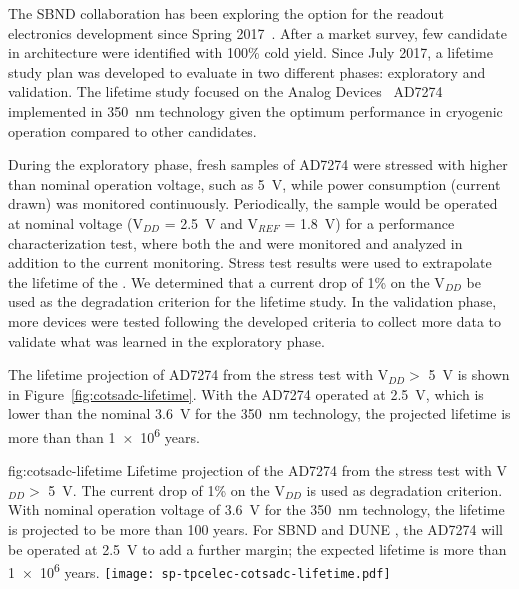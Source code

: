 \label{sec:fdsp-tpcelec-design-femb-alt-cots}

The SBND collaboration has been exploring the   option 
for the  readout electronics development since Spring 
2017~\cite{Chen:2018zic}. After a market survey, few candidate  
in  architecture were identified with 100\% cold yield. Since 
July 2017, a lifetime study plan was developed to evaluate  
 in two different phases: exploratory and validation. The 
lifetime study focused on the Analog Devices~\cite{AnalogDevices} AD7274 
implemented in  \SI{350}{nm}  technology given 
the optimum performance in cryogenic operation compared to other candidates.

During the exploratory phase, fresh samples of   
AD7274 were stressed with higher than nominal operation voltage, such as
\SI{5}{V}, while power consumption (current drawn) was monitored continuously. 
Periodically, the sample would be operated at nominal voltage (V$_{DD}$ = \SI{2.5}{V} 
and V$_{REF}$ = \SI{1.8}{V}) for a performance characterization test, where 
both the  and  were monitored and analyzed in addition 
to the current monitoring. Stress test results were used to extrapolate the 
lifetime of the  . We determined that a current drop 
of \num{1}\% on the V$_{DD}$ be used as the degradation criterion for the lifetime 
study. In the validation phase, more devices were tested following the developed 
criteria to collect more data to validate what was learned in the exploratory phase.

The lifetime projection of   AD7274 from the stress 
test with V$_{DD} >$ \SI{5}{V} is shown in Figure~\ref{fig:cotsadc-lifetime}. 
With the AD7274 operated at \SI{2.5}{V}, which is lower than the nominal 
\SI{3.6}{V} for the \SI{350}{nm}  technology, the projected lifetime 
is more than than \num{1e6} years.

\begin{dunefigure}
{fig:cotsadc-lifetime}
{Lifetime projection of the   AD7274 from the stress test 
with V$_{DD} >$ \SI{5}{V}. The current drop of 1\% on the V$_{DD}$ is used as 
degradation criterion. With nominal operation voltage of \SI{3.6}{V} for the 
\SI{350}{nm}  technology, the lifetime is projected to be more 
than 100 years. For SBND and DUNE , the AD7274 will be operated at 
\SI{2.5}{V} to add a further margin; the expected lifetime is more 
than \num{1e6} years.}
\texttt{[image: sp-tpcelec-cotsadc-lifetime.pdf]}
\end{dunefigure}

